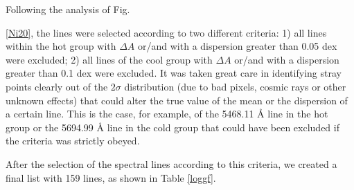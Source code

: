 \documentclass[dvips,12pt,a4paper]{report}
\begin{document}
{Following the analysis of Fig. {\ref{Ni20}, the lines were selected according to two different criteria: 1) all lines within the hot group with $\Delta A$ or/and with a dispersion greater than 0.05 dex were excluded; 2) all lines of the cool group with $\Delta A$ or/and  with a dispersion greater than 0.1 dex were excluded. It was taken great care in identifying stray points clearly out of the $2\sigma$ distribution (due to bad pixels, cosmic rays or other unknown effects) that could alter the true value of the mean or the dispersion of a certain line. This is the case, for example, of the 5468.11 \AA{} line in the hot group or the 5694.99 \AA{} line in the cold group that could have been excluded if the criteria was strictly obeyed.

After the selection of the spectral lines according to this criteria, we created a final list with 159 lines, as shown in Table \ref{loggf}.

}}
\end{document}

